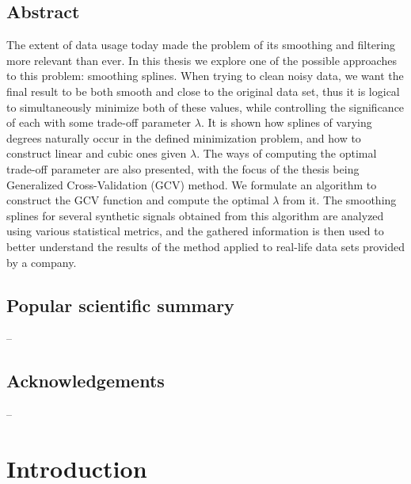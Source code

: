\documentclass[11pt,leqno]{book}
\theoremstyle{definition}
\theoremstyle{plain}
\theoremstyle{definition}
\begin{document}
\vspace*{4cm}
\begin{center}
\section*{Abstract}
\end{center}
{The extent of data usage today made the problem of its smoothing and filtering more relevant than ever. In this thesis we explore one of the possible approaches to this problem: smoothing splines. When trying to clean noisy data, we want the final result to be both smooth and close to the original data set, thus it is logical to simultaneously minimize both of these values, while controlling the significance of each with some trade-off parameter $\lambda.$ It is shown how splines of varying degrees naturally occur in the defined minimization problem, and how to construct linear and cubic ones given $\lambda.$ The ways of computing the optimal trade-off parameter are also presented, with the focus of the thesis being Generalized Cross-Validation (GCV) method. We formulate an algorithm to construct the GCV function and compute the optimal $\lambda$ from it. The smoothing splines for several synthetic signals obtained from this algorithm are analyzed using various statistical metrics, and the gathered information is then used to better understand the results of the method applied to real-life data sets provided by a company.

\vspace*{\fill}
\clearpage
\newpage
\vspace*{4cm}
\begin{center}
\section*{Popular scientific summary}

--
\end{center}
\newpage
\begin{center}
\section*{Acknowledgements}
--
\end{center}



\tableofcontents


\newpage
\chapter{Introduction}
}
\end{document}
